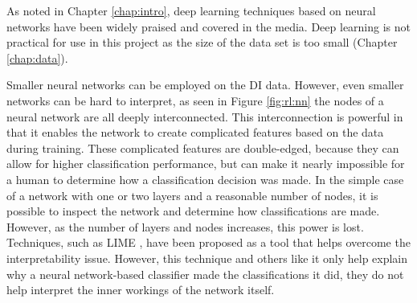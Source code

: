 As noted in Chapter \ref{chap:intro}, deep learning techniques based on neural networks \cite{deepmind2020go} \cite{deepmind2020alphafold2} have been widely praised and covered in the media. Deep learning is not practical for use in this project as the size of the data set is too small (Chapter \ref{chap:data}). 

Smaller neural networks can be employed on the DI data.
However, even smaller networks can be hard to interpret, as seen in Figure \ref{fig:rl:nn} the nodes of a neural network are all deeply interconnected. This interconnection is powerful in that it enables the network to create complicated features based on the data during training. These complicated features are double-edged, because they can allow for higher classification performance, but can make it nearly impossible for a human to determine how a classification decision was made. In the simple case of a network with one or two layers and a reasonable number of nodes, it is possible to inspect the network and determine how classifications are made. However, as the number of layers and nodes increases, this power is lost.
Techniques, such as LIME \cite{ribeiro2016lime} \cite{vanberlo2020interpretable} \cite{lundberg2017shap}, have been proposed as a tool that helps overcome the interpretability issue. However, this technique and others like it only help explain why a neural network-based classifier made the classifications it did, they do not help interpret the inner workings of the network itself. 



